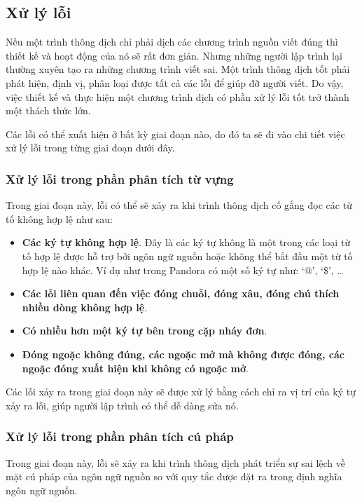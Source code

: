 \subsection{Xử lý lỗi}
Nếu một trình thông dịch chỉ phải dịch các chương trình nguồn viết đúng thì thiết kế và hoạt động của nó sẽ rất đơn giản. Nhưng những người lập trình lại thường xuyên tạo ra những chương trình viết sai. Một trình thông dịch tốt phải phát hiện, định vị, phân loại được tất cả các lỗi để giúp đỡ người viết. Do vậy, việc thiết kế và thực hiện một chương trình dịch có phần xử lý lỗi tốt trở thành một thách thức lớn.

Các lỗi có thể xuất hiện ở bất kỳ giai đoạn nào, do đó ta sẽ đi vào chi tiết việc xử lý lỗi trong từng giai đoạn dưới đây.

\subsubsection{Xử lý lỗi trong phần phân tích từ vựng}
Trong giai đoạn này, lỗi có thể sẽ xảy ra khi trình thông dịch cố gắng đọc các từ tố không hợp lệ như sau:

\begin{itemize}
    \item \textbf{Các ký tự không hợp lệ}. Đây là các ký tự không là một trong các loại từ tố hợp lệ được hỗ trợ bởi ngôn ngữ nguồn hoặc không thể bắt đầu một từ tố hợp lệ nào khác. Ví dụ như trong Pandora có một số ký tự như: `@', `\$', \dots 
    \item \textbf{Các lỗi liên quan đến việc đóng chuỗi, đóng xâu, đóng chú thích nhiều dòng không hợp lệ}. 
    \item \textbf{Có nhiều hơn một ký tự bên trong cặp nháy đơn}.
    \item \textbf{Đóng ngoặc không đúng, các ngoặc mở mà không được đóng, các ngoặc đóng xuất hiện khi không có ngoặc mở}.
\end{itemize}

Các lỗi xảy ra trong giai đoạn này sẽ được xử lý bằng cách chỉ ra vị trí của ký tự xảy ra lỗi, giúp người lập trình có thể dễ dàng sửa nó.

\subsubsection{Xử lý lỗi trong phần phân tích cú pháp}
Trong giai đoạn này, lỗi sẽ xảy ra khi trình thông dịch phát triển sự sai lệch về mặt cú pháp của ngôn ngữ nguồn so với quy tắc được đặt ra trong định nghĩa ngôn ngữ nguồn.

